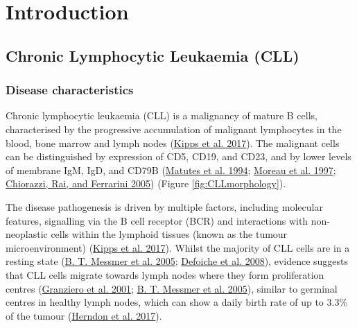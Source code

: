 \documentclass[11pt, a4paper, twosided]{book}
\begin{document}
%
%
\newpage
\pagestyle{plain} %
\setcounter{page}{1}    %

\hypertarget{introduction}{%
\chapter{Introduction}\label{introduction}}

\hypertarget{chronic-lymphocytic-leukaemia-cll}{%
\section{Chronic Lymphocytic Leukaemia (CLL)}\label{chronic-lymphocytic-leukaemia-cll}}

\hypertarget{intro-disease-characteristics}{%
\subsection{Disease characteristics}\label{intro-disease-characteristics}}

Chronic lymphocytic leukaemia (CLL) is a malignancy of mature B cells, characterised by the progressive accumulation of malignant lymphocytes in the blood, bone marrow and lymph nodes (\protect\hyperlink{ref-Kipps2017}{Kipps et al. 2017}). The malignant cells can be distinguished by expression of CD5, CD19, and CD23, and by lower levels of membrane IgM, IgD, and CD79B (\protect\hyperlink{ref-Matutes1994}{Matutes et al. 1994}; \protect\hyperlink{ref-Moreau1997}{Moreau et al. 1997}; \protect\hyperlink{ref-Chiorazzi2005}{Chiorazzi, Rai, and Ferrarini 2005}) (Figure \ref{fig:CLLmorphology}).

The disease pathogenesis is driven by multiple factors, including molecular features, signalling via the B cell receptor (BCR) and interactions with non-neoplastic cells within the lymphoid tissues (known as the tumour microenvironment) (\protect\hyperlink{ref-Kipps2017}{Kipps et al. 2017}). Whilst the majority of CLL cells are in a resting state (\protect\hyperlink{ref-Messmer2005}{B. T. Messmer et al. 2005}; \protect\hyperlink{ref-Defoiche2008}{Defoiche et al. 2008}), evidence suggests that CLL cells migrate towards lymph nodes where they form proliferation centres (\protect\hyperlink{ref-Granziero2001}{Granziero et al. 2001}; \protect\hyperlink{ref-Messmer2005}{B. T. Messmer et al. 2005}), similar to germinal centres in healthy lymph nodes, which can show a daily birth rate of up to 3.3\% of the tumour (\protect\hyperlink{ref-Herndon2017}{Herndon et al. 2017}).
\end{document}
